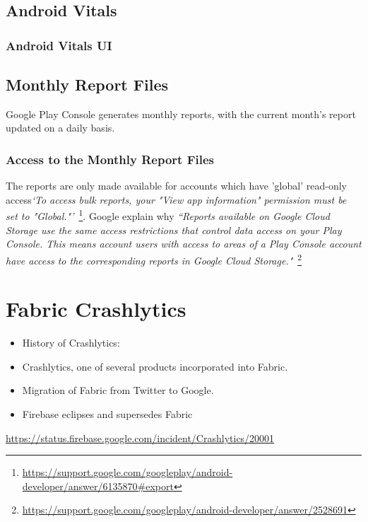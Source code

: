 \subsection{Android Vitals}
\subsubsection{Android Vitals UI}


\subsection{Monthly Report Files}

Google Play Console generates monthly reports, with the current month's report updated on a daily basis. 


\subsubsection{Access to the Monthly Report Files}
The reports are only made available for accounts which have 'global' read-only access\emph{`To access bulk reports, your "View app information" permission must be set to "Global."'}~\footnote{\url{https://support.google.com/googleplay/android-developer/answer/6135870\#export}}. Google explain why \emph{``Reports available on Google Cloud Storage use the same access restrictions that control data access on your Play Console. This means account users with access to areas of a Play Console account have access to the corresponding reports in Google Cloud Storage."}~\footnote{\url{https://support.google.com/googleplay/android-developer/answer/2528691}}  


\section{Fabric Crashlytics}

\begin{itemize}
    \item History of Crashlytics:
    \item Crashlytics, one of several products incorporated into Fabric.
    \item Migration of Fabric from Twitter to Google.
    \item Firebase eclipses and supersedes Fabric
\end{itemize}

\url{https://status.firebase.google.com/incident/Crashlytics/20001}

